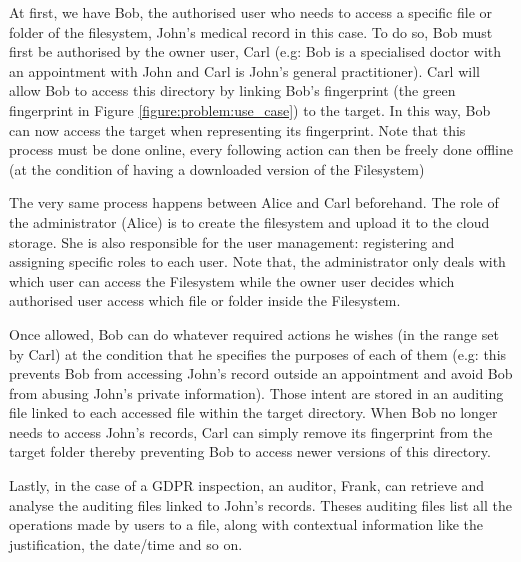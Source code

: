 \documentclass[../main.tex]{subfiles}
\begin{document}
\par At first, we have Bob, the authorised user who needs to access a specific file or folder of the filesystem, John's medical record in this case. To do so, Bob must first be authorised by the owner user, Carl (e.g: Bob is a specialised doctor with an appointment with John and Carl is John's general practitioner). Carl will allow Bob to access this directory by linking Bob's fingerprint (the green fingerprint in Figure \ref{figure:problem:use_case}) to the target. In this way, Bob can now access the target when representing its fingerprint. Note that this process must be done online, every following action can then be freely done offline (at the condition of having a downloaded version of the Filesystem)
\par The very same process happens between Alice and Carl beforehand. The role of the administrator (Alice) is to create the filesystem and upload it to the cloud storage. She is also responsible for the user management: registering and assigning specific roles to each user. Note that, the administrator only deals with which user can access the Filesystem while the owner user decides which authorised user access which file or folder inside the Filesystem.
\par Once allowed, Bob can do whatever required actions he wishes (in the range set by Carl) at the condition that he specifies the purposes of each of them (e.g: this prevents Bob from accessing John's record outside an appointment and avoid Bob from abusing John's private information). Those intent are stored in an auditing file linked to each accessed file within the target directory. When Bob no longer needs to access John's records, Carl can simply remove its fingerprint from the target folder thereby preventing Bob to access newer versions of this directory.
\par Lastly, in the case of a GDPR inspection, an auditor, Frank, can retrieve and analyse the auditing files linked to John's records. Theses auditing files list all the operations made by users to a file, along with contextual information like the justification, the date/time and so on.
\end{document}

